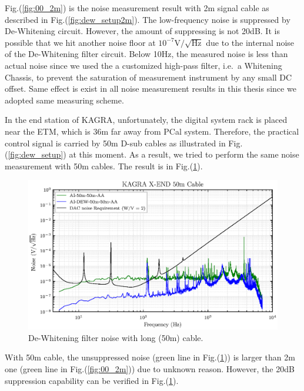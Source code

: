 Fig.(\ref{fig:00_2m}) is the noise measurement result with 2m signal cable as described in Fig.(\ref{fig:dew_setup2m}). The low-frequency noise is suppressed by De-Whitening circuit. However, the amount of suppressing is not 20dB. It is possible that we hit another noise floor at $10^{-7}\mathrm{V}/\sqrt{\mathrm{Hz}}$ due to the internal noise of the De-Whitening filter circuit. Below 10Hz, the measured noise is less than actual noise since we used the a customized high-pass filter, i.e.\ a Whitening Chassis, to prevent the saturation of measurement instrument by any small DC offset. Same effect is exist in all noise measurement results in this thesis since we adopted same measuring scheme.


In the end station of KAGRA, unfortunately, the digital system rack is placed near the ETM, which is 36m far away from PCal system. Therefore, the practical control signal is carried by 50m D-sub cables as illustrated in Fig.(\ref{fig:dew_setup}) at this moment. As a result, we tried to perform the same noise measurement with 50m cables. The result is in Fig.(\ref{fig:00_50m}).
\begin{figure}[hbt!]
\centering
\includegraphics[width=1\textwidth]{figure/noise/00_50m}
\caption[De-Whitening filter noise with long cable]{ De-Whitening filter noise with long (50m) cable. }
\label{fig:00_50m}
\end{figure}

With 50m cable, the unsuppressed noise (green line in Fig.(\ref{fig:00_50m})) is larger than 2m one (green line in Fig.(\ref{fig:00_2m})) due to unknown reason. However, the 20dB suppression capability can be verified in Fig.(\ref{fig:00_50m}). 






